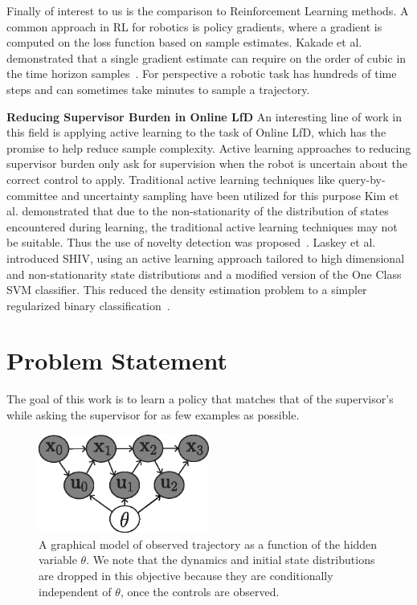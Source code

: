 \documentclass[10pt, conference]{ieeeconf}      %
\begin{document}
Finally of interest to us is the comparison to Reinforcement Learning methods. A common approach in RL for robotics is policy gradients, where a gradient is computed on the loss function based on sample estimates. Kakade et al. demonstrated that  a single gradient estimate can require on the order of cubic in the time horizon samples~\cite{kakade2003sample}. For perspective a robotic task has hundreds of time steps and can sometimes take minutes to sample a trajectory.

\noindent\textbf{Reducing Supervisor Burden in Online LfD} 
An interesting line of work in this field is applying active learning to the task of Online LfD, which has the promise to help reduce sample complexity. Active learning approaches to reducing supervisor burden only ask for supervision when the robot is uncertain about the
correct control to apply. Traditional active learning techniques like query-by-committee and uncertainty sampling have
been utilized for this purpose \cite{chernova2009interactive,judah2011active,grollman2007dogged}
Kim et al. demonstrated that due to the non-stationarity of the distribution of states encountered during
learning, the traditional active learning techniques may not be suitable.
Thus the use of novelty detection was proposed~\cite{kim2013maximum}. Laskey et al. introduced SHIV, using an active
learning approach tailored to high dimensional and non-stationarity state distributions and a modified version of the
One Class SVM classifier. This reduced the density estimation problem to a 
simpler regularized binary classification~\cite{laskeyshiv}. 


\section{Problem Statement}\label{sec:PS}
The goal of this work is to learn a policy that matches that of the supervisor's while asking the supervisor for as few examples as possible.

\begin{figure}
\includegraphics[width=0.5\textwidth]{f_figs/graph_model.eps}
\caption{
    \footnotesize
A graphical model of observed trajectory as a function of the hidden variable $\theta$.  We note that the dynamics and initial state distributions are dropped in this objective because they are conditionally independent of $\theta$, once the controls are observed. }
\vspace*{-20pt}
\label{fig:graphModel}
\end{figure}
\end{document}
